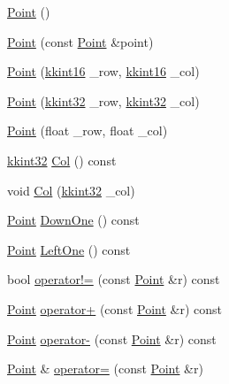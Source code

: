 \begin{DoxyCompactItemize}
\item 
\hyperlink{class_k_k_b_1_1_point_ad92f2337b839a94ce97dcdb439b4325a}{Point} ()
\item 
\hyperlink{class_k_k_b_1_1_point_a53534941e7bcb3c6d3af84d58a542899}{Point} (const \hyperlink{class_k_k_b_1_1_point}{Point} \&point)
\item 
\hyperlink{class_k_k_b_1_1_point_a1c983a0ac89d94ba6420add97d5a5fc9}{Point} (\hyperlink{namespace_k_k_b_a93809780ee294124dda4c23069f41248}{kkint16} \+\_\+row, \hyperlink{namespace_k_k_b_a93809780ee294124dda4c23069f41248}{kkint16} \+\_\+col)
\item 
\hyperlink{class_k_k_b_1_1_point_a9e5d2ef589dbaa8be51dc4ae5d36dd73}{Point} (\hyperlink{namespace_k_k_b_a8fa4952cc84fda1de4bec1fbdd8d5b1b}{kkint32} \+\_\+row, \hyperlink{namespace_k_k_b_a8fa4952cc84fda1de4bec1fbdd8d5b1b}{kkint32} \+\_\+col)
\item 
\hyperlink{class_k_k_b_1_1_point_ad1f5fd0c253f55094eabd436b01f58b4}{Point} (float \+\_\+row, float \+\_\+col)
\item 
\hyperlink{namespace_k_k_b_a8fa4952cc84fda1de4bec1fbdd8d5b1b}{kkint32} \hyperlink{class_k_k_b_1_1_point_afb196b03757fc697f6ade0129a1c7fcf}{Col} () const 
\item 
void \hyperlink{class_k_k_b_1_1_point_a2646cb865f7915fb821dea52468b2491}{Col} (\hyperlink{namespace_k_k_b_a8fa4952cc84fda1de4bec1fbdd8d5b1b}{kkint32} \+\_\+col)
\item 
\hyperlink{class_k_k_b_1_1_point}{Point} \hyperlink{class_k_k_b_1_1_point_ae313d1f1ac88d1bcd8dd8467eac61446}{Down\+One} () const 
\item 
\hyperlink{class_k_k_b_1_1_point}{Point} \hyperlink{class_k_k_b_1_1_point_a31fb1dfcfb37b831f895c1e2376a55c8}{Left\+One} () const 
\item 
bool \hyperlink{class_k_k_b_1_1_point_a3e36514f8aa6af017b5dcc0b5311ce02}{operator!=} (const \hyperlink{class_k_k_b_1_1_point}{Point} \&r) const 
\item 
\hyperlink{class_k_k_b_1_1_point}{Point} \hyperlink{class_k_k_b_1_1_point_aab107359f60edceb100c5a253da6069e}{operator+} (const \hyperlink{class_k_k_b_1_1_point}{Point} \&r) const 
\item 
\hyperlink{class_k_k_b_1_1_point}{Point} \hyperlink{class_k_k_b_1_1_point_a64b12f4709e01c02bf285c8628f24761}{operator-\/} (const \hyperlink{class_k_k_b_1_1_point}{Point} \&r) const 
\item 
\hyperlink{class_k_k_b_1_1_point}{Point} \& \hyperlink{class_k_k_b_1_1_point_aed548722a60e1a04c77e59431935ca5a}{operator=} (const \hyperlink{class_k_k_b_1_1_point}{Point} \&r)

\end{DoxyCompactItemize}
